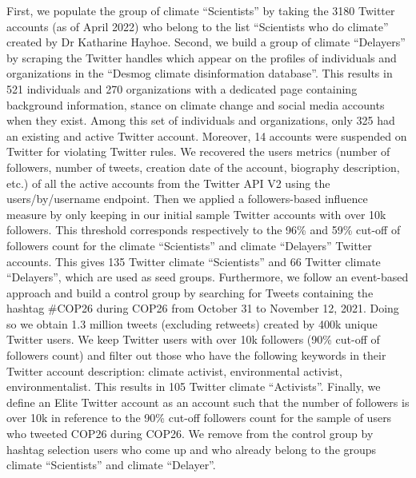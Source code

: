 \documentclass{article}
\begin{document}
First, we populate the group of climate “Scientists” by taking the 3180 Twitter accounts (as of April 2022) who belong to the list “Scientists who do climate” created by Dr Katharine Hayhoe. Second, we build a group of climate “Delayers” by scraping the Twitter handles which appear on the profiles of individuals and organizations in the “Desmog climate disinformation database”. This results in 521 individuals and 270 organizations with a dedicated page containing background information, stance on climate change and social media accounts when they exist. Among this set of individuals and organizations, only 325 had an existing and active Twitter account. Moreover, 14 accounts were suspended on Twitter for violating Twitter rules. We recovered the users metrics (number of followers, number of tweets, creation date of the account, biography description, etc.) of all the active accounts from the Twitter API V2 using the users/by/username endpoint. Then we applied a followers-based influence measure by only keeping in our initial sample Twitter accounts with over 10k followers. This threshold corresponds respectively to the 96\% and 59\% cut-off of followers count for the climate “Scientists” and climate “Delayers” Twitter accounts. This gives 135 Twitter climate “Scientists” and 66 Twitter climate “Delayers”, which are used as seed groups. Furthermore, we follow an event-based approach and build a control group by searching for Tweets containing the hashtag  \#COP26 during COP26 from October 31 to November 12, 2021. Doing so we obtain 1.3 million tweets (excluding retweets) created by 400k unique Twitter users. We keep Twitter users with over 10k followers (90\% cut-off of followers count) and filter out those who have the following keywords in their Twitter account description: climate activist, environmental activist, environmentalist. This results in 105 Twitter climate “Activists”. 
Finally, we define an Elite Twitter account as an account such that the number of followers is over 10k in reference to the 90\% cut-off followers count for the sample of users who tweeted COP26 during COP26. We remove from the control group by hashtag selection users who come up and who already belong to the groups climate “Scientists” and climate “Delayer”.
\end{document}
